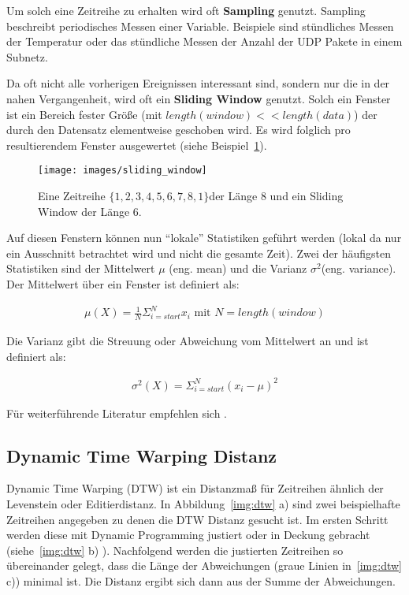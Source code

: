 Um solch eine Zeitreihe zu erhalten wird oft \textbf{Sampling}
genutzt.  Sampling beschreibt periodisches Messen einer Variable.
Beispiele sind stündliches Messen der Temperatur oder das stündliche
Messen der Anzahl der UDP Pakete in einem Subnetz.

Da oft nicht alle vorherigen Ereignissen interessant sind, sondern nur
die in der nahen Vergangenheit, wird oft ein \textbf{Sliding Window}
genutzt. Solch ein Fenster ist ein Bereich fester Größe (mit
$length(window) << length(data)$) der durch den Datensatz elementweise
geschoben wird. Es wird folglich pro resultierendem Fenster
ausgewertet (siehe Beispiel~\ref{img:sw}).

\begin{figure} [ht]                                   
\centering
\texttt{[image: images/sliding\_window]}  
\caption{Eine Zeitreihe $\{1,2,3,4,5,6,7,8,1\}$der Länge 8 und ein
  Sliding Window der Länge 6.}         
\label{img:sw}
\end{figure}

Auf diesen Fenstern können nun ``lokale'' Statistiken geführt werden
(lokal da nur ein Ausschnitt betrachtet wird und nicht die gesamte
Zeit).  Zwei der häufigsten Statistiken sind der Mittelwert $\mu$
(eng. mean) und die Varianz $\sigma^2$(eng. variance). Der Mittelwert
über ein Fenster ist definiert als:

\begin{align}
\mu(X) = \frac{1}{N}\Sigma_{i = start} ^ {N} x_i \text{ mit } N = length(window)
\end{align}

Die Varianz gibt die Streuung oder Abweichung vom Mittelwert an und
ist definiert als:

\begin{align} \sigma^2(X) = \Sigma_{i = start} ^ {N} (x_i - \mu )^2
\end{align}

Für weiterführende Literatur empfehlen sich \cite{gama, ts}.

\subsection{Dynamic Time Warping Distanz}

Dynamic Time Warping (DTW) ist ein Distanzmaß für Zeitreihen ähnlich
der Levenstein oder Editierdistanz.  In Abbildung~\ref{img:dtw} a)
sind zwei beispielhafte Zeitreihen angegeben zu denen die DTW Distanz
gesucht ist.  Im ersten Schritt werden diese mit Dynamic Programming
justiert oder in Deckung gebracht (siehe~\ref{img:dtw} b) ).
Nachfolgend werden die justierten Zeitreihen so übereinander gelegt,
dass die Länge der Abweichungen (graue Linien in~\ref{img:dtw} c))
minimal ist. Die Distanz ergibt sich dann aus der Summe der
Abweichungen.


